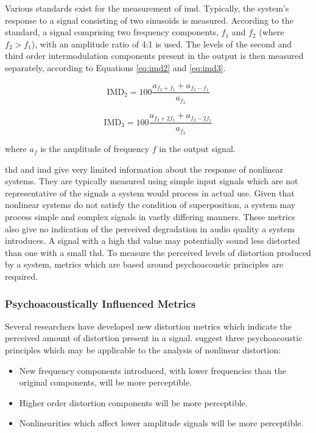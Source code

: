 			Various standards exist for the measurement of \acrshort{imd}. Typically, the system's response to
			a signal consisting of two sinusoids is measured. According to the \citet{IEC2001amplifiers}
			standard, a signal comprising two frequency components, $f_{1}$ and $f_{2}$ (where $f_{2} >
			f_{1}$), with an amplitude ratio of 4:1 is used.  The levels of the second and third order
			intermodulation components present in the output is then measured separately, according to
			Equations \ref{eq:imd2} and \ref{eq:imd3}.

			\begin{equation}
				\mathrm{IMD}_{2} = 100\frac{a_{f_{2} + f_{1}} + a_{f_{2} - f_{1}}}{a_{f_{2}}}
				\label{eq:imd2}
			\end{equation}

			\begin{equation}
				\mathrm{IMD}_{3} = 100\frac{a_{f_{2} + 2f_{1}} + a_{f_{2} - 2f_{1}}}{a_{f_{2}}}
				\label{eq:imd3}
			\end{equation}

			where $a_{f}$ is the amplitude of frequency $f$ in the output signal.

			\acrshort{thd} and \acrshort{imd} give very limited information about the response of nonlinear
			systems. They are typically measured using simple input signals which are not representative of the
			signals a system would process in actual use. Given that nonlinear systems do not satisfy the
			condition of superposition, a system may process simple and complex signals in vastly differing
			manners. These metrics also give no indication of the perceived degradation in audio quality a
			system introduces. A signal with a high \acrshort{thd} value may potentially sound less distorted
			than one with a small \acrshort{thd}. To measure the perceived levels of distortion produced by a
			system, metrics which are based around psychoacoustic principles are required.

		\subsubsection*{Psychoacoustically Influenced Metrics}
			Several researchers have developed new distortion metrics which indicate the perceived amount of
			distortion present in a signal. \citet{geddes2003auditory} suggest three psychoacoustic principles
			which may be applicable to the analysis of nonlinear distortion:

			\begin{itemize}
				\item New frequency components introduced, with lower frequencies than the original
					components, will be more perceptible.
				\item Higher order distortion components will be more perceptible.
				\item Nonlinearities which affect lower amplitude signals will be more perceptible.
			\end{itemize}

